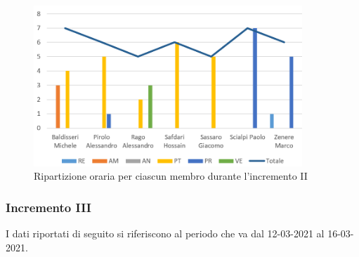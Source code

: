 \begin{figure}[!htb]   
    \centering
    \includegraphics[width=0.9\textwidth]{Images/inc2}
	\caption{Ripartizione oraria per ciascun membro durante l'incremento II}
\end{figure}

\subsubsection{Incremento III}

I dati riportati di seguito si riferiscono al periodo che va dal 12-03-2021 al 16-03-2021.

